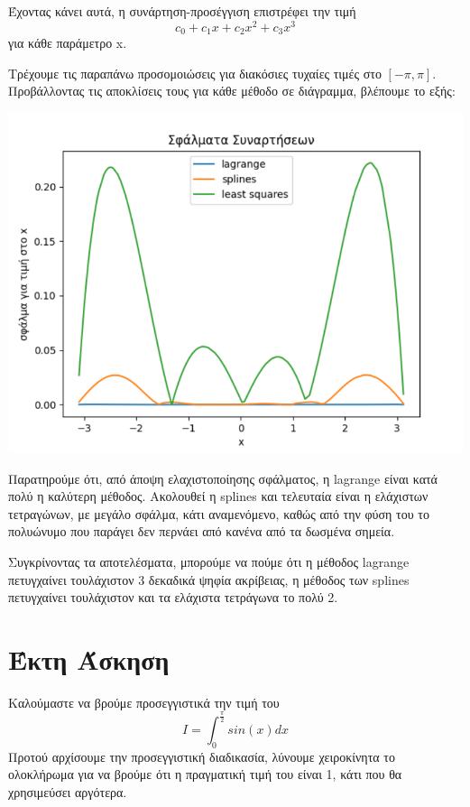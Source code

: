 \documentclass{article}
\newcommand{\lt}{\latintext}
\newcommand{\gt}{\greektext}
\begin{document}
\gt Έχοντας κάνει αυτά, η συνάρτηση-προσέγγιση επιστρέφει την τιμή
\begin{equation*}
    c_0 + c_1x + c_2x^2 + c_3x^3 
\end{equation*}
\gt για κάθε παράμετρο \lt x.

\gt Τρέχουμε τις παραπάνω προσομοιώσεις για διακόσιες τυχαίες τιμές στο $[-\pi,\pi]$. 
\gt Προβάλλοντας τις αποκλίσεις τους για κάθε μέθοδο σε διάγραμμα, βλέπουμε το εξής:
\begin{center}
    \includegraphics[scale=0.7]{images/res_graph.png}
\end{center}
\gt Παρατηρούμε ότι, από άποψη ελαχιστοποίησης σφάλματος, η \lt lagrange \gt είναι κατά πολύ η
\gt καλύτερη μέθοδος. Ακολουθεί η \lt splines \gt και τελευταία είναι η ελάχιστων τετραγώνων, με 
\gt μεγάλο σφάλμα, κάτι αναμενόμενο, καθώς από την φύση του το πολυώνυμο που παράγει δεν περνάει από
\gt κανένα από τα δωσμένα σημεία.

\gt Συγκρίνοντας τα αποτελέσματα, μπορούμε να πούμε ότι η μέθοδος \lt lagrange \gt πετυγχαίνει
\gt τουλάχιστον 3 δεκαδικά ψηφία ακρίβειας, η μέθοδος των \lt splines \gt πετυγχαίνει τουλάχιστον
\gt 1 και τα ελάχιστα τετράγωνα το πολύ 2.

\pagebreak
\section{\gt Έκτη Άσκηση}

\gt Καλούμαστε να βρούμε προσεγγιστικά την τιμή του
\begin{equation*}
    I = \int_{0}^{\frac{\pi}{2}}sin(x)dx
\end{equation*}
\gt Προτού αρχίσουμε την προσεγγιστική διαδικασία, λύνουμε χειροκίνητα το ολοκλήρωμα για να
\gt βρούμε ότι η πραγματική τιμή του είναι 1, κάτι που θα χρησιμεύσει αργότερα.
\end{document}
